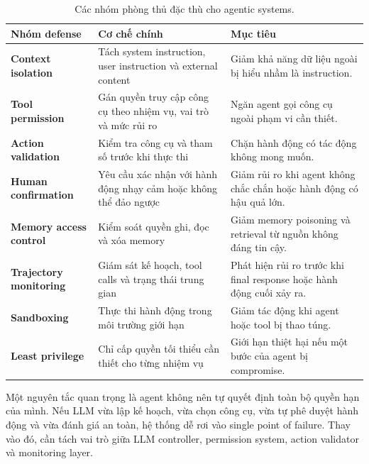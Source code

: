 \begin{table}[H]
\centering
\caption{Các nhóm phòng thủ đặc thù cho agentic systems.}
\label{tab:agent-specific-defenses}
\begin{tabularx}{\textwidth}{
    >{\bfseries}p{}
    p{}
    X
}
\toprule
Nhóm defense
& Cơ chế chính
& Mục tiêu \\
\midrule

Context isolation
& Tách system instruction, user instruction và external content
& Giảm khả năng dữ liệu ngoài bị hiểu nhầm là instruction. \\

Tool permission
& Gán quyền truy cập công cụ theo nhiệm vụ, vai trò và mức rủi ro
& Ngăn agent gọi công cụ ngoài phạm vi cần thiết. \\

Action validation
& Kiểm tra công cụ và tham số trước khi thực thi
& Chặn hành động có tác động không mong muốn. \\

Human confirmation
& Yêu cầu xác nhận với hành động nhạy cảm hoặc không thể đảo ngược
& Giảm rủi ro khi agent không chắc chắn hoặc hành động có hậu quả lớn. \\

Memory access control
& Kiểm soát quyền ghi, đọc và xóa memory
& Giảm memory poisoning và retrieval từ nguồn không đáng tin cậy. \\

Trajectory monitoring
& Giám sát kế hoạch, tool calls và trạng thái trung gian
& Phát hiện rủi ro trước khi final response hoặc hành động cuối xảy ra. \\

Sandboxing
& Thực thi hành động trong môi trường giới hạn
& Giảm tác động khi agent hoặc tool bị thao túng. \\

Least privilege
& Chỉ cấp quyền tối thiểu cần thiết cho từng nhiệm vụ
& Giới hạn thiệt hại nếu một bước của agent bị compromise. \\

\bottomrule
\end{tabularx}
\end{table}

Một nguyên tắc quan trọng là agent không nên tự quyết định toàn bộ quyền
hạn của mình. Nếu LLM vừa lập kế hoạch, vừa chọn công cụ, vừa tự phê duyệt
hành động và vừa đánh giá an toàn, hệ thống dễ rơi vào single point of
failure. Thay vào đó, cần tách vai trò giữa LLM controller, permission
system, action validator và monitoring layer.

